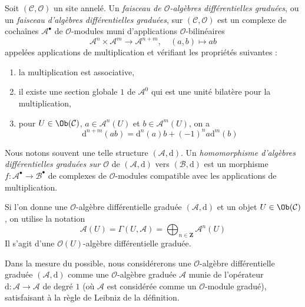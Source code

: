 \begin{definition}
\label{definition-dga} Soit
$(\mathcal{C}, \mathcal{O})$ un site annelé. Un
{\it faisceau de $\mathcal{O}$-algèbres différentielles graduées}, ou
un {\it faisceau d'algèbres différentielles graduées},
sur $(\mathcal{C}, \mathcal{O})$ est un complexe de
cochaînes $\mathcal{A}^\bullet$ de $\mathcal{O}$-modules
muni d'applications $\mathcal{O}$-bilinéaires
$$
\mathcal{A}^n \times \mathcal{A}^m \to \mathcal{A}^{n + m},\quad
(a, b) \longmapsto ab
$$
appelées applications de multiplication et vérifiant les propriétés
suivantes : \begin{enumerate}
\item la multiplication est
associative, \item il existe une section globale $1$ de $\mathcal{A}^0$
qui est une unité bilatère pour la
multiplication, \item pour $U \in \Ob(\mathcal{C})$, $a \in \mathcal{A}^n(U)$
et $b \in \mathcal{A}^m(U)$, on a
$$
\text{d}^{n + m}(ab) = \text{d}^n(a)b + (-1)^n a\text{d}^m(b)
$$
\end{enumerate} Nous
notons souvent une telle structure $(\mathcal{A}, \text{d})$. Un
{\it homomorphisme d'algèbres différentielles graduées sur $\mathcal{O}$}
de $(\mathcal{A}, \text{d})$ vers $(\mathcal{B}, \text{d})$ est un morphisme
$f : \mathcal{A}^\bullet \to \mathcal{B}^\bullet$ de complexes de
$\mathcal{O}$-modules compatible avec les applications de multiplication.
\end{definition}

\noindent
Si l'on donne une $\mathcal{O}$-algèbre différentielle graduée $(\mathcal{A}, \text{d})$
et un objet $U \in \Ob(\mathcal{C})$, on utilise la notation
$$
\mathcal{A}(U)
= \Gamma(U, \mathcal{A}) =
\bigoplus\nolimits_{n \in \mathbf{Z}} \mathcal{A}^n(U)
$$ Il
s'agit d'une $\mathcal{O}(U)$-algèbre différentielle graduée.

\medskip\noindent
Dans la mesure du possible, nous considérerons une
$\mathcal{O}$-algèbre différentielle graduée $(\mathcal{A}, \text{d})$
comme une $\mathcal{O}$-algèbre graduée $\mathcal{A}$ munie
de l'opérateur $\text{d} : \mathcal{A} \to \mathcal{A}$ de degré $1$
(où $\mathcal{A}$ est considérée comme un $\mathcal{O}$-module gradué),
satisfaisant à la règle de Leibniz de la définition.

